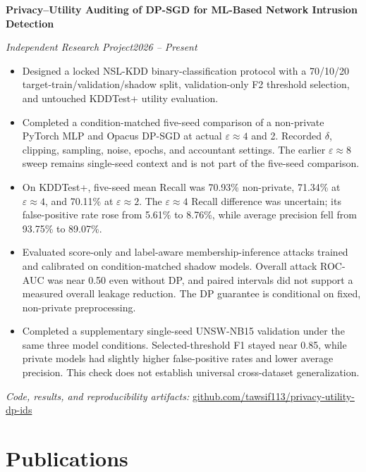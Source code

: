 \documentclass[11pt,letterpaper]{article}
\newcommand{\projectentry}[3]{%
  \textbf{#1}\par
  \textit{#3}\hfill\textit{#2}\par
}
\begin{document}
\projectentry{Privacy--Utility Auditing of DP-SGD for ML-Based Network Intrusion Detection}
{2026 -- Present}{Independent Research Project}
\begin{itemize}
  \item Designed a locked NSL-KDD binary-classification protocol with a
  70/10/20 target-train/validation/shadow split, validation-only F2 threshold
  selection, and untouched KDDTest+ utility evaluation.

  \item Completed a condition-matched five-seed comparison of a non-private
  PyTorch MLP and Opacus DP-SGD at actual $\varepsilon\approx4$ and 2.
  Recorded $\delta$, clipping, sampling, noise, epochs, and accountant
  settings. The earlier $\varepsilon\approx8$ sweep remains single-seed
  context and is not part of the five-seed comparison.

  \item On KDDTest+, five-seed mean Recall was 70.93\% non-private, 71.34\%
  at $\varepsilon\approx4$, and 70.11\% at $\varepsilon\approx2$. The
  $\varepsilon\approx4$ Recall difference was uncertain; its false-positive
  rate rose from 5.61\% to 8.76\%, while average precision fell from 93.75\%
  to 89.07\%.

  \item Evaluated score-only and label-aware membership-inference attacks
  trained and calibrated on condition-matched shadow models. Overall attack
  ROC-AUC was near 0.50 even without DP, and paired intervals did not support a
  measured overall leakage reduction. The DP guarantee is conditional on fixed,
  non-private preprocessing.

  \item Completed a supplementary single-seed UNSW-NB15 validation under the
  same three model conditions. Selected-threshold F1 stayed near 0.85, while
  private models had slightly higher false-positive rates and lower average
  precision. This check does not establish universal cross-dataset
  generalization.
\end{itemize}
\textit{Code, results, and reproducibility artifacts:}
\href{https://github.com/tawsif113/privacy-utility-dp-ids}{github.com/tawsif113/privacy-utility-dp-ids}

\section*{Publications}
\end{document}
